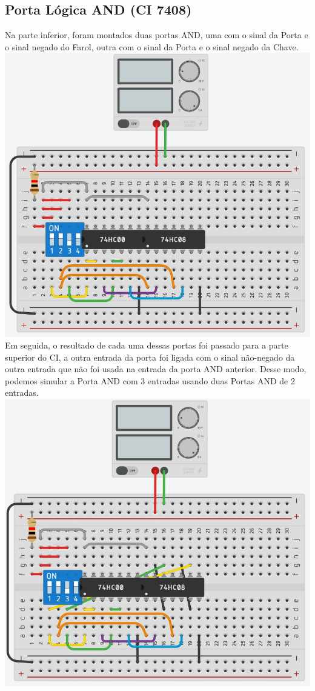 \documentclass[]{article}
\begin{document}
		\subsection{Porta Lógica AND (CI 7408)}
			Na parte inferior, foram montados duas portas AND, uma com o sinal da Porta e o sinal negado do Farol, outra com o sinal da Porta e o sinal negado da Chave. \\
			\includegraphics[scale=0.5]{Images/Tinkercad 03.jpg} \\
			Em seguida, o resultado de cada uma dessas portas foi passado para a parte superior do CI, a outra entrada da porta foi ligada com o sinal não-negado da outra entrada que não foi usada na entrada da porta AND anterior. Desse modo, podemos simular a Porta AND com 3 entradas usando duas Portas AND de 2 entradas. \\
			\includegraphics[scale=0.5]{Images/Tinkercad 04.jpg} \\
\end{document}
